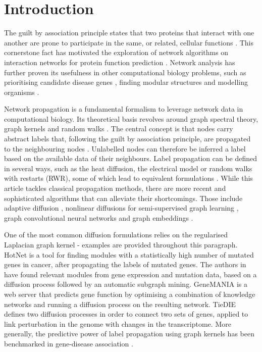 \documentclass[final]{bioinfo}
\begin{document}
\section{Introduction}

The guilt by association principle states that two proteins that interact with one another are prone to participate in the same, or related, cellular functions \citep{gba}. 
This cornerstone fact has motivated the exploration of network algorithms on interaction networks for protein function prediction \citep{sharan2007network}. 
Network analysis has further proven its usefulness in other computational biology problems, such as prioritising candidate disease genes \citep{barabasi2011network}, finding modular structures \citep{diffusionmodules} and modelling organisms \citep{aderem2005systems}.

Network propagation is a fundamental formalism to leverage network data in computational biology. 
Its theoretical basis revolves around graph spectral theory, graph kernels and random walks \citep{smola}.  
The central concept is that nodes carry abstract labels that, following the guilt by association principle, are propagated to the neighbouring nodes \citep{labelpropagation}. 
Unlabelled nodes can therefore be inferred a label based on the available data of their neighbours.
Label propagation can be defined in several ways, such as the heat diffusion, the electrical model or random walks with restarts (RWR), some of which lead to equivalent formulations \citep{cowen2017network}. 
While this article tackles classical propagation methods, there are more recent and sophisticated algorithms that can alleviate their shortcomings.
Those include adaptive diffusion \citep{jiang2017aptrank}, nonlinear diffusions for semi-supervised graph learning \citep{ibrahim2019nonlinear}, graph convolutional neural networks \citep{sun2020graph} and graph embeddings \citep{grover2016node2vec}.

One of the most common diffusion formulations relies on the regularised Laplacian graph kernel \citep{smola} - examples are provided throughout this paragraph.
HotNet \citep{hotnet} is a tool for finding modules with a statistically high number of mutated genes in cancer, after propagating the labels of mutated genes.
The authors in \citep{mosca} have found relevant modules from gene expression and mutation data, based on a diffusion process followed by an automatic subgraph mining.
GeneMANIA \citep{genemania} is a web server that predicts gene function by optimising a combination of knowledge networks and running a diffusion process on the resulting network. 
TieDIE \citep{tiedie} defines two diffusion processes in order to connect two sets of genes, applied to link perturbation in the genome with changes in the transcriptome.
More generally, the predictive power of label propagation using graph kernels has been benchmarked in gene-disease association \citep{valentini, diffusion_gwas, diffusionbenchmark}.
\end{document}
